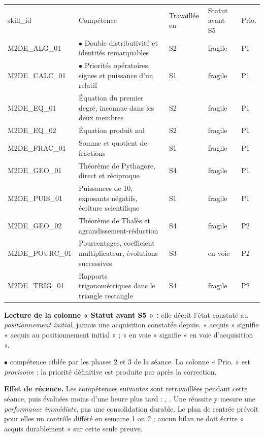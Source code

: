 \documentclass[10pt,a4paper]{article}
\begin{document}
\newpage{}
\par\noindent\begin{tabularx}{\linewidth}{>{\ttfamily\scriptsize}p{27mm} X >{\scriptsize}p{16mm} >{\scriptsize}p{20mm} >{\scriptsize\centering\arraybackslash}p{9mm}}
\rowcolor{Navy}\color{white}\scriptsize skill\_id & \color{white}Compétence & \color{white}Travaillée en & \color{white}Statut avant S5 & \color{white}Prio. \\
M2DE\_ALG\_01 & $\bullet$ Double distributivité et identités remarquables & S2 & fragile & P1 \\
M2DE\_CALC\_01 & $\bullet$ Priorités opératoires, signes et puissance d'un relatif & S1 & fragile & P1 \\
M2DE\_EQ\_01 & Équation du premier degré, inconnue dans les deux membres & S2 & fragile & P1 \\
M2DE\_EQ\_02 & Équation produit nul & S2 & fragile & P1 \\
M2DE\_FRAC\_01 & Somme et quotient de fractions & S1 & fragile & P1 \\
M2DE\_GEO\_01 & Théorème de Pythagore, direct et réciproque & S4 & fragile & P1 \\
M2DE\_PUIS\_01 & Puissances de 10, exposants négatifs, écriture scientifique & S1 & fragile & P1 \\
M2DE\_GEO\_02 & Théorème de Thalès et agrandissement-réduction & S4 & fragile & P2 \\
M2DE\_POURC\_01 & Pourcentages, coefficient multiplicateur, évolutions successives & S3 & en voie & P2 \\
M2DE\_TRIG\_01 & Rapports trigonométriques dans le triangle rectangle & S4 & fragile & P2 \\
\end{tabularx}
\par\vspace{1mm}\small\textbf{Lecture de la colonne « Statut avant S5 » :} elle décrit l'état constaté au \emph{positionnement initial}, jamais une acquisition constatée depuis. « acquis » signifie « acquis au positionnement initial » ; « en voie » signifie « en voie d'acquisition ».
\par\small$\bullet$ compétence ciblée par les phases 2 et 3 de la séance. La colonne « Prio. » est \emph{provisoire} : la priorité définitive est produite par  après la correction.
\begin{warningbox}\textbf{Effet de récence.} Les compétences suivantes sont retravaillées pendant cette séance, puis évaluées moins d'une heure plus tard : , . Une réussite y mesure une \emph{performance immédiate}, pas une consolidation durable. Le plan de rentrée prévoit pour elles un contrôle différé en semaine 1 ou 2 ; aucun bilan ne doit écrire « acquis durablement » sur cette seule preuve.\end{warningbox}
\end{document}
